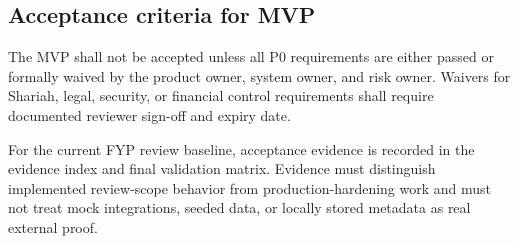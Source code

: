 \documentclass[11pt,a4paper]{article}
\begin{document}
\subsection{Acceptance criteria for MVP}
The MVP shall not be accepted unless all P0 requirements are either passed or formally waived by the product owner, system owner, and risk owner. Waivers for Shariah, legal, security, or financial control requirements shall require documented reviewer sign-off and expiry date.

For the current FYP review baseline, acceptance evidence is recorded in the evidence index and final validation matrix. Evidence must distinguish implemented review-scope behavior from production-hardening work and must not treat mock integrations, seeded data, or locally stored metadata as real external proof.
\end{document}
